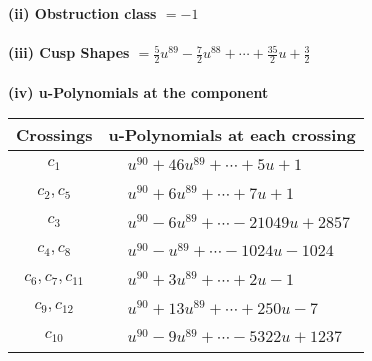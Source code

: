 \documentclass[1p]{elsarticle_modified}
\theoremstyle{definition}
\begin{document}
\flushleft \textbf{(ii) Obstruction class $= -1$}\\~\\
\flushleft \textbf{(iii) Cusp Shapes $= \frac{5}{2} u^{89}-\frac{7}{2} u^{88}+\cdots+\frac{35}{2} u+\frac{3}{2}$}\\~\\
\newpage\renewcommand{\arraystretch}{1}
\flushleft \textbf{(iv) u-Polynomials at the component}\newline \\
\begin{tabular}{m{50pt}|m{274pt}}
Crossings & \hspace{64pt}u-Polynomials at each crossing \\
\hline $$\begin{aligned}c_{1}\end{aligned}$$&$\begin{aligned}
&u^{90}+46 u^{89}+\cdots+5 u+1
\end{aligned}$\\
\hline $$\begin{aligned}c_{2},c_{5}\end{aligned}$$&$\begin{aligned}
&u^{90}+6 u^{89}+\cdots+7 u+1
\end{aligned}$\\
\hline $$\begin{aligned}c_{3}\end{aligned}$$&$\begin{aligned}
&u^{90}-6 u^{89}+\cdots-21049 u+2857
\end{aligned}$\\
\hline $$\begin{aligned}c_{4},c_{8}\end{aligned}$$&$\begin{aligned}
&u^{90}- u^{89}+\cdots-1024 u-1024
\end{aligned}$\\
\hline $$\begin{aligned}c_{6},c_{7},c_{11}\end{aligned}$$&$\begin{aligned}
&u^{90}+3 u^{89}+\cdots+2 u-1
\end{aligned}$\\
\hline $$\begin{aligned}c_{9},c_{12}\end{aligned}$$&$\begin{aligned}
&u^{90}+13 u^{89}+\cdots+250 u-7
\end{aligned}$\\
\hline $$\begin{aligned}c_{10}\end{aligned}$$&$\begin{aligned}
&u^{90}-9 u^{89}+\cdots-5322 u+1237
\end{aligned}$\\
\hline
\end{tabular}\\~\\
\end{document}
